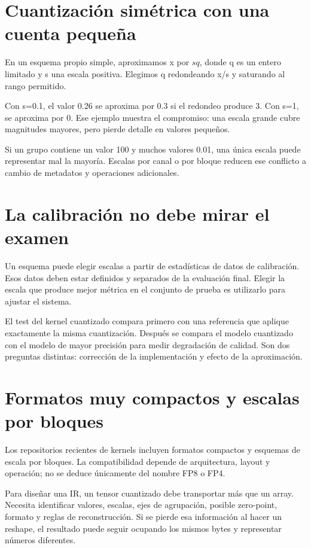 \documentclass[12pt,a4paper,oneside]{report}
\begin{document}
\section{Cuantización simétrica con una cuenta pequeña}
En un esquema propio simple, aproximamos x por $s q$, donde q es un entero limitado y s una escala positiva. Elegimos q redondeando x/s y saturando al rango permitido.

Con s=0.1, el valor 0.26 se aproxima por 0.3 si el redondeo produce 3. Con s=1, se aproxima por 0. Ese ejemplo muestra el compromiso: una escala grande cubre magnitudes mayores, pero pierde detalle en valores pequeños.

Si un grupo contiene un valor 100 y muchos valores 0.01, una única escala puede representar mal la mayoría. Escalas por canal o por bloque reducen ese conflicto a cambio de metadatos y operaciones adicionales.

\section{La calibración no debe mirar el examen}
Un esquema puede elegir escalas a partir de estadísticas de datos de calibración. Esos datos deben estar definidos y separados de la evaluación final. Elegir la escala que produce mejor métrica en el conjunto de prueba es utilizarlo para ajustar el sistema.

El test del kernel cuantizado compara primero con una referencia que aplique exactamente la misma cuantización. Después se compara el modelo cuantizado con el modelo de mayor precisión para medir degradación de calidad. Son dos preguntas distintas: corrección de la implementación y efecto de la aproximación.

\section{Formatos muy compactos y escalas por bloques}
Los repositorios recientes de kernels incluyen formatos compactos y esquemas de escala por bloques. La compatibilidad depende de arquitectura, layout y operación; no se deduce únicamente del nombre FP8 o FP4. \cite{cutlass,deepgemm,deepgemm-ascend}

Para diseñar una IR, un tensor cuantizado debe transportar más que un array. Necesita identificar valores, escalas, ejes de agrupación, posible zero-point, formato y reglas de reconstrucción. Si se pierde esa información al hacer un reshape, el resultado puede seguir ocupando los mismos bytes y representar números diferentes.
\end{document}
